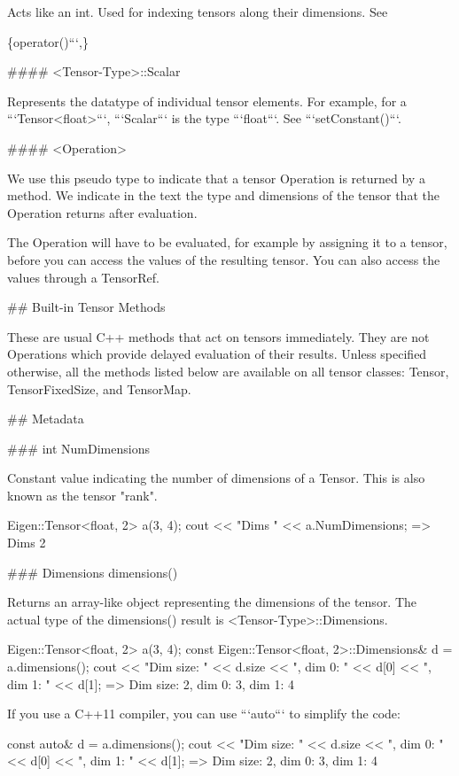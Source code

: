 Acts like an {\ttfamily int}. Used for indexing tensors along their dimensions. See 
\begin{DoxyCode}
\{operator()```,\}

#### <Tensor-Type>::Scalar

Represents the datatype of individual tensor elements.  For example, for a
```Tensor<float>```, ```Scalar``` is the type ```float```.  See
```setConstant()```.

#### <Operation>

We use this pseudo type to indicate that a tensor Operation is returned by a
method.  We indicate in the text the type and dimensions of the tensor that the
Operation returns after evaluation.

The Operation will have to be evaluated, for example by assigning it to a
tensor, before you can access the values of the resulting tensor.  You can also
access the values through a TensorRef.


## Built-in Tensor Methods

These are usual C++ methods that act on tensors immediately.  They are not
Operations which provide delayed evaluation of their results.  Unless specified
otherwise, all the methods listed below are available on all tensor classes:
Tensor, TensorFixedSize, and TensorMap.

## Metadata

### int NumDimensions

Constant value indicating the number of dimensions of a Tensor.  This is also
known as the tensor "rank".

      Eigen::Tensor<float, 2> a(3, 4);
      cout << "Dims " << a.NumDimensions;
      => Dims 2

### Dimensions dimensions()

Returns an array-like object representing the dimensions of the tensor.
The actual type of the dimensions() result is <Tensor-Type>::Dimensions.

    Eigen::Tensor<float, 2> a(3, 4);
    const Eigen::Tensor<float, 2>::Dimensions& d = a.dimensions();
    cout << "Dim size: " << d.size << ", dim 0: " << d[0]
         << ", dim 1: " << d[1];
    => Dim size: 2, dim 0: 3, dim 1: 4

If you use a C++11 compiler, you can use ```auto``` to simplify the code:

    const auto& d = a.dimensions();
    cout << "Dim size: " << d.size << ", dim 0: " << d[0]
         << ", dim 1: " << d[1];
    => Dim size: 2, dim 0: 3, dim 1: 4


\end{DoxyCode}
